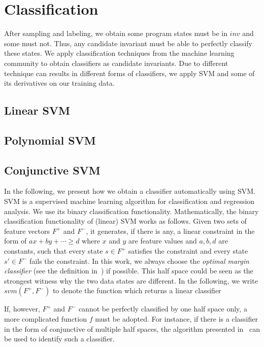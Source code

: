 
\section{Classification}
After sampling and labeling, we obtain some program states must be in $inv$ and some must not. 
Thus, any candidate invariant must be able to perfectly classify these states. 
We apply classification techniques from the machine learning community to obtain classifiers as candidate invariants.
Due to different technique can results in different forms of classifiers,
we apply SVM and some of its derivatives on our training data. 

\subsection{Linear SVM}
\subsection{Polynomial SVM}
\subsection{Conjunctive SVM}
In the following, we present how we obtain a classifier automatically using SVM. 
SVM is a supervised machine learning algorithm for classification and regression analysis. 
We use its binary classification functionality. 
Mathematically, the binary classification functionality of (linear) SVM works as follows. 
Given two sets of feature vectors $F^+$ and $F^-$, it generates, if there is any, 
a linear constraint in the form of $ax + by + \cdots \geq d$ where $x$ and $y$ are feature values and $a, b, d$ are constants, 
such that every state $s \in F^+$ satisfies the constraint and every state $s' \in F^-$ fails the constraint. 
In this work, we always choose the \textit{optimal margin classifier} (see the definition in~\cite{Sharma2012}) if possible. 
This half space could be seen as the strongest witness why the two data states are different. 
In the following, we write $svm(F^+, F^-)$ to denote the function which returns a linear classifier

If, however, $F^+$ and $F^-$ cannot be perfectly classified by one half space only, 
a more complicated function $f$ must be adopted. 
For instance, if there is a classifier in the form of conjunctive of multiple half spaces, 
the algorithm presented in~\cite{Sharma2012} can be used to identify such a classifier.


